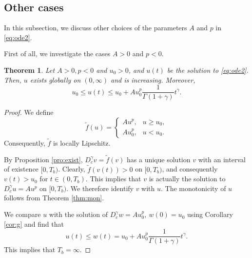 \documentclass[12pt]{amsart}%
\newtheorem{thm}{Theorem}[section]
\theoremstyle{definition}
\theoremstyle{remark}
\newtheorem{rmk}[thm]{Remark}
\renewcommand{\leq}{\leqslant}
\renewcommand{\geq}{\geqslant}
\renewcommand{\ge}{\geqslant}
\renewcommand{\le}{\leqslant}
\begin{document}

\subsection{Other cases}
In this subsection, we discuss other choices of the parameters $A$ and $p$ in \eqref{eq:ode2}.

First of all, we investigate the cases $A>0$ and $p<0$.
\begin{thm}
Let $A>0, p< 0$ and $u_0>0$, and $u(t)$ be the solution to \eqref{eq:ode2}. Then, $u$ exists globally on $(0,\infty)$ and is increasing. Moreover, 
\[
u_0\le u(t)\le u_0+Au_0^{p}\frac{1}{\Gamma(1+\gamma)}t^{\gamma}.
\]
\end{thm}

\begin{proof}
We define
\[
\tilde{f}(u)=
\begin{cases}
Au^p, & u\ge u_0,\\
Au_0^p, & u<u_0.
\end{cases}
\] 
Consequently, $\tilde{f}$ is locally Lipschitz. 

By Proposition \ref{pro:exist}, $D_c^{\gamma}v=\tilde{f}(v)$ has a unique solution $v$ with an interval of existence $[0, T_b)$. Clearly, $\tilde{f}(v(t))>0$ on $[0, T_b)$, and consequently $v(t)>u_0$ for $t\in (0, T_b)$. This implies that $v$ is actually the solution to $D_c^{\gamma}u=Au^p$ on $[0, T_b)$. We therefore identify $v$ with $u$.  The monotonicity of $u$ follows from Theorem \ref{thm:mon}. 

We compare $u$ with the solution of $D_c^{\gamma}w=Au_0^{p}, ~w(0)=u_0$ using Corollary \ref{cor:g} and find that
\[
u(t)\le w(t)=u_0+Au_0^{p}\frac{1}{\Gamma(1+\gamma)}t^{\gamma}.
\]
This implies that $T_b=\infty$.
\end{proof}
\end{document}
